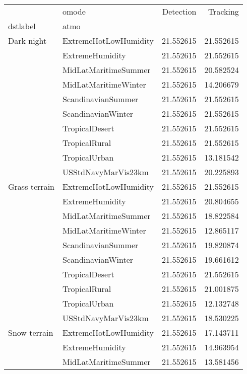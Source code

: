 \begin{tabular}{llrr}
\toprule
             & omode &  Detection &   Tracking \\
dstlabel & atmo &            &            \\
\midrule
Dark night & ExtremeHotLowHumidity &  21.552615 &  21.552615 \\
             & ExtremeHumidity &  21.552615 &  21.552615 \\
             & MidLatMaritimeSummer &  21.552615 &  20.582524 \\
             & MidLatMaritimeWinter &  21.552615 &  14.206679 \\
             & ScandinavianSummer &  21.552615 &  21.552615 \\
             & ScandinavianWinter &  21.552615 &  21.552615 \\
             & TropicalDesert &  21.552615 &  21.552615 \\
             & TropicalRural &  21.552615 &  21.552615 \\
             & TropicalUrban &  21.552615 &  13.181542 \\
             & USStdNavyMarVis23km &  21.552615 &  20.225893 \\
Grass terrain & ExtremeHotLowHumidity &  21.552615 &  21.552615 \\
             & ExtremeHumidity &  21.552615 &  20.804655 \\
             & MidLatMaritimeSummer &  21.552615 &  18.822584 \\
             & MidLatMaritimeWinter &  21.552615 &  12.865117 \\
             & ScandinavianSummer &  21.552615 &  19.820874 \\
             & ScandinavianWinter &  21.552615 &  19.661612 \\
             & TropicalDesert &  21.552615 &  21.552615 \\
             & TropicalRural &  21.552615 &  21.001875 \\
             & TropicalUrban &  21.552615 &  12.132748 \\
             & USStdNavyMarVis23km &  21.552615 &  18.530225 \\
Snow terrain & ExtremeHotLowHumidity &  21.552615 &  17.143711 \\
             & ExtremeHumidity &  21.552615 &  14.963954 \\
             & MidLatMaritimeSummer &  21.552615 &  13.581456 \\

\end{tabular}
